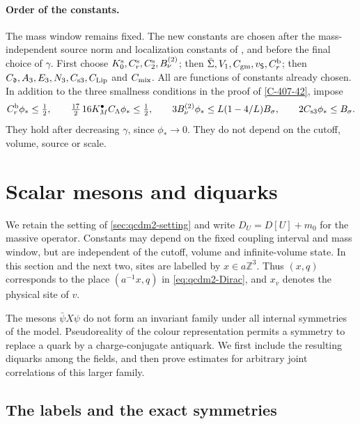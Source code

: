 \documentclass[11pt,letterpaper,reqno]{amsart}
\theoremstyle{definition}
\theoremstyle{remark}
\begin{document}
\paragraph{Order of the constants.}\label{C-415-12}
The mass window remains fixed. The new constants are chosen
after the mass-independent source norm and localization
constants of \cite[Prop. 10.20]{QCDM1}, and before
the final choice of $\gamma$. First choose
$K_0^{\rm s},C_r^{\rm s},C_2^{\rm s},B_\nu^{(2)}$;
then $\bar\Sigma,V_1,C_{\rm gm},v_{\mathsf S},C_r^{\rm b}$;
then $C_{\mathfrak d},A_3,E_3,N_3,C_{\rm s3},C_{\rm Lip}$
and $C_{\rm mix}$.  All are functions of constants already
chosen.  In addition to the three smallness conditions in
the proof of \cref{C-407-42}, impose
\[
 C_r^{\rm b}\phi_*\le\tfrac12,\qquad
 \tfrac{17}{2}\,16K_M^\bullet C_\Lambda\phi_*\le\tfrac12,
 \qquad
 3B_\nu^{(2)}\phi_*\le L(1-4/L)B_\sigma,
 \qquad2C_{\rm s3}\phi_*\le B_\sigma.
\]
They hold after decreasing $\gamma$, since $\phi_*\to0$.
They do not depend on the cutoff, volume, source or scale.

\section{Scalar mesons and diquarks}
\label{sec:qcd2-bilinears}

We retain the setting of \cref{sec:qcdm2-setting} and write
$D_U=D[U]+m_0$ for the massive operator. Constants may depend
on the fixed coupling interval and mass window, but are
independent of the cutoff, volume and infinite-volume state.
In this section and the next two, sites are labelled by
$x\in a\mathbb Z^3$. Thus $(x,q)$ corresponds to the place
$(a^{-1}x,q)$ in \eqref{eq:qcdm2-Dirac}, and $x_v$ denotes
the physical site of $v$.

The mesons $\bar\psi X\psi$ do not form an invariant family under
all internal symmetries of the model. Pseudoreality of the colour
representation permits a symmetry to replace a quark by a
charge-conjugate antiquark. We first include the resulting
diquarks among the fields, and then prove estimates for arbitrary
joint correlations of this larger family.

\subsection{The labels and the exact symmetries}
\end{document}
